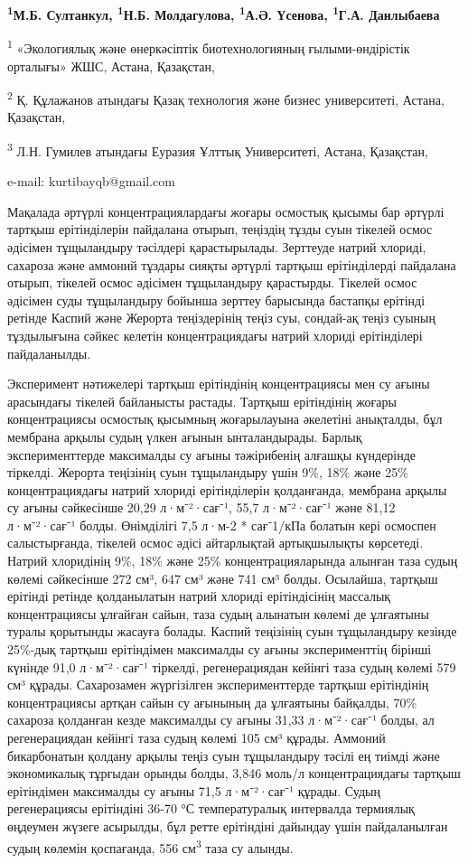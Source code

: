 {\bfseries \textsuperscript{1}М.Б. Султанкул, \textsuperscript{1}Н.Б.
Молдагулова, \textsuperscript{1}А.Ә. Үсенова, \textsuperscript{1}Г.А.
Данлыбаева}

\textsuperscript{1} «Экологиялық және өнеркәсіптік биотехнологияның
ғылыми-өндірістік орталығы» ЖШС, Астана, Қазақстан,

\textsuperscript{2} Қ. Құлажанов атындағы Қазақ технология және бизнес
университеті, Астана, Қазақстан,

\textsuperscript{3} Л.Н. Гумилев атындағы Еуразия Ұлттық Университеті,
Астана, Қазақстан,

e-mail: kurtibayqb@gmail.com

Мақалада әртүрлі концентрациялардағы жоғары осмостық қысымы бар әртүрлі
тартқыш ерітінділерін пайдалана отырып, теңіздің тұзды суын тікелей
осмос әдісімен тұщыландыру тәсілдері қарастырылады. Зерттеуде натрий
хлориді, сахароза және аммоний тұздары сияқты әртүрлі тартқыш
ерітінділерді пайдалана отырып, тікелей осмос әдісімен тұщыландыру
қарастырды. Тікелей осмос әдісімен суды тұщыландыру бойынша зерттеу
барысында бастапқы ерітінді ретінде Каспий және Жерорта теңіздерінің
теңіз суы, сондай-ақ теңіз суының тұздылығына сәйкес келетін
концентрациядағы натрий хлориді ерітінділері пайдаланылды.

Эксперимент нәтижелері тартқыш ерітіндінің концентрациясы мен су ағыны
арасындағы тікелей байланысты растады. Тартқыш ерітіндінің жоғары
концентрациясы осмостық қысымның жоғарылауына әкелетіні анықталды, бұл
мембрана арқылы судың үлкен ағынын ынталандырады. Барлық
эксперименттерде максималды су ағыны тәжірибенің алғашқы күндерінде
тіркелді. Жерорта теңізінің суын тұщыландыру үшін 9\%, 18\% және 25\%
концентрациядағы натрий хлориді ерітінділерін қолданғанда, мембрана
арқылы су ағыны сәйкесінше 20,29 л·м⁻²·сағ⁻¹, 55,7 л·м⁻²·сағ⁻¹ және
81,12 л·м⁻²·сағ⁻¹ болды. Өнімділігі 7,5 л·м-2 * сағ⁻1/кПа болатын кері
осмоспен салыстырғанда, тікелей осмос әдісі айтарлықтай артықшылықты
көрсетеді. Натрий хлоридінің 9\%, 18\% және 25\% концентрацияларында
алынған таза судың көлемі сәйкесінше 272 см³, 647 см³ және 741 см³
болды. Осылайша, тартқыш ерітінді ретінде қолданылатын натрий хлориді
ерітіндісінің массалық концентрациясы ұлғайған сайын, таза судың
алынатын көлемі де ұлғаятыны туралы қорытынды жасауға болады. Каспий
теңізінің суын тұщыландыру кезінде 25\%-дық тартқыш ерітіндімен
максималды су ағыны эксперименттің бірінші күнінде 91,0 л·м⁻²·сағ⁻¹
тіркелді, регенерациядан кейінгі таза судың көлемі 579 см³ құрады.
Сахарозамен жүргізілген эксперименттерде тартқыш ерітіндінің
концентрациясы артқан сайын су ағынының да ұлғаятыны байқалды, 70\%
сахароза қолданған кезде максималды су ағыны 31,33 л·м⁻²·сағ⁻¹ болды, ал
регенерациядан кейінгі таза судың көлемі 105 см³ құрады. Аммоний
бикарбонатын қолдану арқылы теңіз суын тұщыландыру тәсілі ең тиімді және
экономикалық тұрғыдан орынды болды, 3,846 моль/л концентрациядағы
тартқыш ерітіндімен максималды су ағыны 71,5 л·м⁻²·сағ⁻¹ құрады. Судың
регенерациясы ерітіндіні 36-70 °С температуралық интервалда термиялық
өңдеумен жүзеге асырылды, бұл ретте ерітіндіні дайындау үшін
пайдаланылған судың көлемін қоспағанда, 556 см\textsuperscript{3} таза
су алынды.

